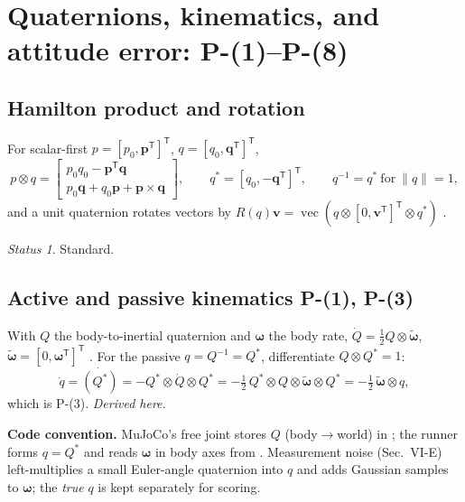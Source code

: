 \documentclass[11pt]{article}
\newcommand{\srcroot}{../..}
\newcommand{\T}{^{\mathsf T}}
\newcommand{\vecpart}{\operatorname{vec}}
\newcommand{\Peq}[1]{P-(#1)}
\newcommand{\code}[1]{\path{#1}}
\theoremstyle{remark}
\newtheorem*{status}{Status}
\newcommand{\listing}[4]{%
  \Needspace{8\baselineskip}%
  }
\begin{document}
\section{Quaternions, kinematics, and attitude error: \Peq{1}--\Peq{8}}\label{sec:quat}
\subsection{Hamilton product and rotation}
For scalar-first $p=[p_0,\bm p\T]\T$, $q=[q_0,\bm q\T]\T$,
\begin{equation}
p\otimes q=\begin{bmatrix}p_0q_0-\bm p\T\bm q\\ p_0\bm q+q_0\bm p+\bm p\times\bm q\end{bmatrix},\qquad
q^*=[q_0,-\bm q\T]\T,\qquad q^{-1}=q^*\ \text{for}\ \|q\|=1,
\label{eq:hamilton}
\end{equation}
and a unit quaternion rotates vectors by $R(q)\bm v=\vecpart(q\otimes[0,\bm v\T]\T\otimes q^*)$
\cite{diebel2006quaternion,schaub2018amss}.
\begin{status}Standard.\end{status}
\listing{src/gra_control/math3d.py}{12}{25}{conjugate and Hamilton product \eqref{eq:hamilton}}

\subsection{Active and passive kinematics \Peq{1}, \Peq{3}}
With $Q$ the body-to-inertial quaternion and $\bm\omega$ the body rate, $\dot Q=\tfrac12Q\otimes\tilde{\bm\omega}$,
$\tilde{\bm\omega}=[0,\bm\omega\T]\T$ \cite{schaub2018amss}. For the passive $q=Q^{-1}=Q^*$, differentiate $Q\otimes Q^*=1$:
\[
\dot q=\dot{(Q^*)}=-Q^*\otimes\dot Q\otimes Q^*=-\tfrac12\,Q^*\otimes Q\otimes\tilde{\bm\omega}\otimes Q^*=-\tfrac12\,\tilde{\bm\omega}\otimes q,
\]
which is \Peq{3}. \emph{Derived here.}

\textbf{Code convention.} MuJoCo's free joint stores $Q$ (body$\to$world) in \code{qpos}; the runner forms $q=Q^*$ and reads
$\bm\omega$ in body axes from \code{qvel}. Measurement noise (Sec.~VI-E) left-multiplies a small Euler-angle quaternion into
$q$ and adds Gaussian samples to $\bm\omega$; the \emph{true} $q$ is kept separately for scoring.
\listing{experiments/final_robustness_gating_2026-09-20/run_final_robustness.py}{316}{339}{true and fed-back state, noise, reference, error}
\end{document}
